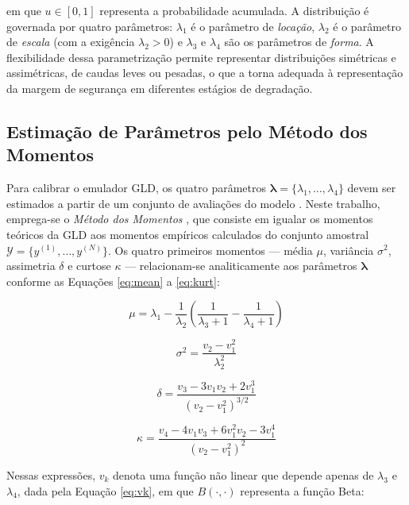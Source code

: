 em que $u \in [0, 1]$ representa a probabilidade acumulada. A distribuição é governada por quatro parâmetros: $\lambda_1$ é o parâmetro de \textit{locação}, $\lambda_2$ é o parâmetro de \textit{escala} (com a exigência $\lambda_2 > 0$) e $\lambda_3$ e $\lambda_4$ são os parâmetros de \textit{forma}. A flexibilidade dessa parametrização permite representar distribuições simétricas e assimétricas, de caudas leves ou pesadas, o que a torna adequada à representação da margem de segurança em diferentes estágios de degradação.

\subsection{Estimação de Parâmetros pelo Método dos Momentos}

Para calibrar o emulador GLD, os quatro parâmetros $\boldsymbol{\lambda} = \{\lambda_1, \dots, \lambda_4\}$ devem ser estimados a partir de um conjunto de avaliações do modelo \cite{karian2010handbook, corlu2016}. Neste trabalho, emprega-se o \textit{Método dos Momentos} \cite{lakhany2000}, que consiste em igualar os momentos teóricos da GLD aos momentos empíricos calculados do conjunto amostral $\mathcal{Y} = \{y^{(1)}, \dots, y^{(N)}\}$. Os quatro primeiros momentos --- média $\mu$, variância $\sigma^2$, assimetria $\delta$ e curtose $\kappa$ --- relacionam-se analiticamente aos parâmetros $\boldsymbol{\lambda}$ conforme as Equações \eqref{eq:mean} a \eqref{eq:kurt}:

\begin{equation}\label{eq:mean}
\mu = \lambda_1 - \frac{1}{\lambda_2} \left( \frac{1}{\lambda_3 + 1} - \frac{1}{\lambda_4 + 1} \right)
\end{equation}

\begin{equation}\label{eq:var}
\sigma^2 = \frac{v_2 - v_1^2}{\lambda_2^2}
\end{equation}

\begin{equation}\label{eq:skew}
\delta = \frac{v_3 - 3v_1v_2 + 2v_1^3}{(v_2 - v_1^2)^{3/2}}
\end{equation}

\begin{equation}\label{eq:kurt}
\kappa = \frac{v_4 - 4v_1v_3 + 6v_1^2v_2 - 3v_1^4}{(v_2 - v_1^2)^2}
\end{equation}

Nessas expressões, $v_k$ denota uma função não linear que depende apenas de $\lambda_3$ e $\lambda_4$, dada pela Equação \eqref{eq:vk}, em que $B(\cdot, \cdot)$ representa a função Beta:

